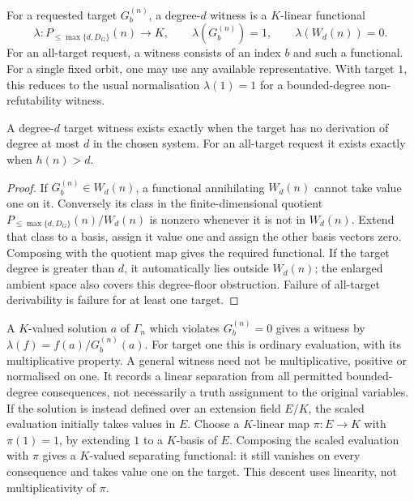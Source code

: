 \begin{definition}
\label{tx:def:consistency-witness}
For a requested target $G_b^{(n)}$, a degree-$d$ witness is a $K$-linear
functional
\[
 \lambda:P_{\le\max\{d,D_G\}}(n)\longrightarrow K,\qquad
 \lambda(G_b^{(n)})=1,\qquad\lambda(W_d(n))=0.
\]
For an all-target request, a witness consists of an index $b$ and such
a functional. For a single fixed orbit, one may use any available
representative. With target $1$, this reduces to the usual normalisation
$\lambda(1)=1$ for a bounded-degree non-refutability witness.
\end{definition}

\begin{proposition}
\label{tx:prop:dual-witness}
A degree-$d$ target witness exists exactly when the target has no
derivation of degree at most $d$ in the chosen system. For an all-target
request it exists exactly when $h(n)>d$.
\end{proposition}
\begin{proof}
If $G_b^{(n)}\in W_d(n)$, a functional annihilating $W_d(n)$ cannot
take value one on it. Conversely its class in the finite-dimensional
quotient $P_{\le\max\{d,D_G\}}(n)/W_d(n)$ is nonzero whenever
it is not in $W_d(n)$. Extend that class to a basis, assign it value
one and assign the other basis vectors zero. Composing with the
quotient map gives the required functional. If the target degree is
greater than $d$, it automatically lies outside $W_d(n)$; the enlarged
ambient space also covers this degree-floor obstruction. Failure of
all-target derivability is failure for at least one target.
\end{proof}

A $K$-valued solution $a$ of $\Gamma_n$ which violates $G_b^{(n)}=0$ gives a
witness by $\lambda(f)=f(a)/G_b^{(n)}(a)$. For target one this is ordinary
evaluation, with its multiplicative property. A general witness need
not be multiplicative, positive or normalised on one. It records a
linear separation from all permitted bounded-degree consequences,
not necessarily a truth assignment to the original variables. If the solution is instead defined over an extension field $E/K$, the scaled evaluation initially takes values in $E$. Choose a $K$-linear map $\pi:E\to K$ with $\pi(1)=1$, by extending $1$ to a $K$-basis of $E$. Composing the scaled evaluation with $\pi$ gives a $K$-valued separating functional: it still vanishes on every consequence and takes value one on the target. This descent uses linearity, not multiplicativity of $\pi$.

